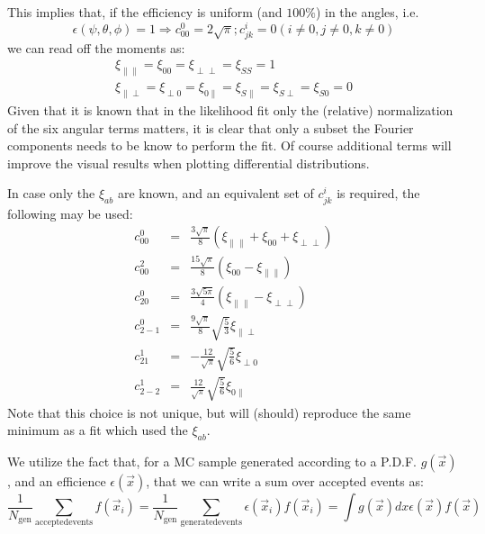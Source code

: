 \documentclass[a4paper,9pt,twosided]{article}
\begin{document}
This implies that, if the efficiency is uniform (and $100\%$) in the angles, i.e.
\begin{equation}
   \epsilon(\psi,\theta,\phi) = 1 \Rightarrow c^0_{00} = 2\sqrt{\pi} ; c^{i}_{jk} = 0 (i\neq 0, j\neq 0, k \neq 0)
\end{equation}
we can read off the moments as:
\begin{eqnarray}
    \xi_{\parallel\parallel} = \xi_{00}= \xi_{\perp\perp} = \xi_{SS} = 1\\
    \xi_{\parallel\perp} =\xi_{\perp 0} = \xi_{0\parallel} =\xi_{S \parallel} = \xi_{S \perp} = \xi_{S 0} =0
\end{eqnarray}
Given that it is known that  in the likelihood fit only the (relative) normalization of the six angular
terms matters, it is clear that only a subset the Fourier components needs to be know to
perform the fit. Of course additional terms will improve the visual results when plotting 
differential distributions.

In case only the $\xi_{ab}$ are known, and an equivalent set of $c^i_{jk}$ is required, the 
following may be used:
\begin{eqnarray}
 c^0_{00}  &=& \frac{3\sqrt{\pi}}{8}( \xi_{\parallel \parallel }+\xi_{00}+\xi_{\perp\perp} )     \\
 c^2_{00}  &=& \frac{15\sqrt{\pi}}{8}( \xi_{00} - \xi_{\parallel \parallel } )    \\
 c^0_{20}  &=& \frac{3\sqrt{5\pi}}{4} ( \xi_{\parallel \parallel } - \xi_{\perp\perp} )    \\
 c^0_{2-1} &=& \frac{9\sqrt{\pi}}{8}\sqrt{\frac{5}{3}}  \xi_{\parallel \perp}    \\
 c^1_{21}  &=& - \frac{12}{\sqrt{\pi}}\sqrt{\frac{5}{6}} \xi_{\perp0}    \\
 c^1_{2-2} &=&   \frac{12}{\sqrt{\pi}}\sqrt{\frac{5}{6}}  \xi_{0\parallel }
\end{eqnarray}
Note that this choice is not unique, but will (should)  reproduce the same minimum as a fit which used
the $\xi_{ab}$.




We utilize the fact that, for a MC sample generated according to a P.D.F. $g(\vec{x})$,
and an efficience $\epsilon(\vec{x})$, that we can write a sum over accepted events as:
\begin{equation}
  \frac{1}{N_{\mathrm{gen}}} \sum_{\mathrm{accepted events}} f(\vec{x}_i) = \frac{1}{N_{\mathrm{gen}}} \sum_{\mathrm{generated events}} \epsilon(\vec{x}_i) f(\vec{x}_i) =  \int g(\vec{x})dx \epsilon(\vec{x}) f(\vec{x})
\end{equation}
\end{document}
